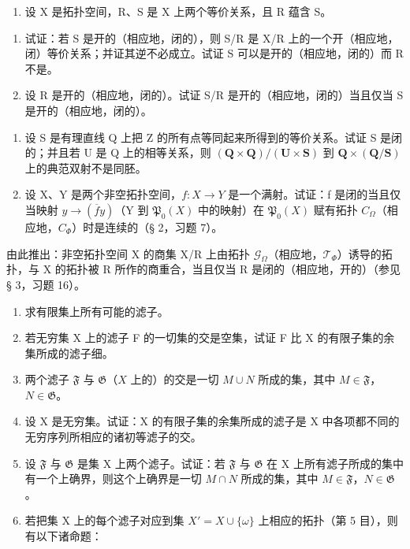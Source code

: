 \begin{enumerate}
\def\labelenumi{\arabic{enumi})}
\setcounter{enumi}{4}
\tightlist
\item
  设 X 是拓扑空间，R、S 是 X 上两个等价关系，且 R 蕴含 S。
\end{enumerate}

\begin{enumerate}
\def\labelenumi{\alph{enumi})}
\tightlist
\item
  试证：若 S 是开的（相应地，闭的），则 S/R 是 X/R 上的一个开（相应地，闭）等价关系；并证其逆不必成立。试证 S 可以是开的（相应地，闭的）而 R 不是。
\item
  设 R 是开的（相应地，闭的）。试证 S/R 是开的（相应地，闭的）当且仅当 S 是开的（相应地，闭的）。
\end{enumerate}

\begin{enumerate}
\def\labelenumi{\arabic{enumi})}
\setcounter{enumi}{5}
\item
  设 S 是有理直线 Q 上把 Z 的所有点等同起来所得到的等价关系。试证 S 是闭的；并且若 U 是 Q 上的相等关系，则 \((\mathbf{Q} \times \mathbf{Q}) / (\mathbf{U} \times \mathbf{S})\) 到 \(\mathbf{Q} \times (\mathbf{Q}/\mathbf{S})\) 上的典范双射不是同胚。
\item
  设 X、Y 是两个非空拓扑空间，\(f: X \to Y\) 是一个满射。试证：f 是闭的当且仅当映射 \(y \to (\overline{f} y)\)（Y 到 \(\mathfrak{P}_{0}(X)\) 中的映射）在 \(\mathfrak{P}_{0}(X)\) 赋有拓扑 \(C_{\Omega}\)（相应地，\(C_{\Phi}\)）时是连续的（§ 2，习题 7）。
\end{enumerate}

由此推出：非空拓扑空间 X 的商集 X/R 上由拓扑 \(\mathcal{G}_{\Omega}\)（相应地，\(\mathcal{T}_{\Phi}\)）诱导的拓扑，与 X 的拓扑被 R 所作的商重合，当且仅当 R 是闭的（相应地，开的）（参见 § 3，习题 16）。

\BourbakiExerciseGroup

\begin{enumerate}
\def\labelenumi{\arabic{enumi})}
\item
  求有限集上所有可能的滤子。
\item
  若无穷集 X 上的滤子 F 的一切集的交是空集，试证 F 比 X 的有限子集的余集所成的滤子细。
\item
  两个滤子 \(\mathfrak{F}\) 与 \(\mathfrak{G}\)（\(X\) 上的）的交是一切 \(M \cup N\) 所成的集，其中 \(M \in \mathfrak{F}\)，\(N \in \mathfrak{G}\)。
\item
  设 X 是无穷集。试证：X 的有限子集的余集所成的滤子是 X 中各项都不同的无穷序列所相应的诸初等滤子的交。
\item
  设 \(\mathfrak{F}\) 与 \(\mathfrak{G}\) 是集 X 上两个滤子。试证：若 \(\mathfrak{F}\) 与 \(\mathfrak{G}\) 在 X 上所有滤子所成的集中有一个上确界，则这个上确界是一切 \(M \cap N\) 所成的集，其中 \(M \in \mathfrak{F}\)，\(N \in \mathfrak{G}\)。
\item
  若把集 X 上的每个滤子对应到集 \(X' = X \cup \{\omega\}\) 上相应的拓扑（第 5 目），则有以下诸命题：
\end{enumerate}

